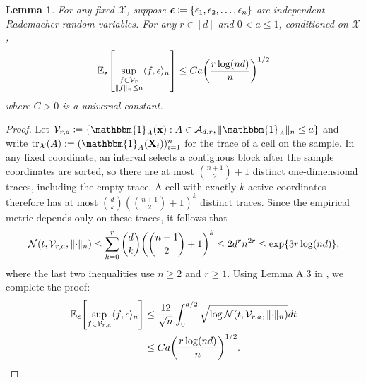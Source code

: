 \documentclass[11pt]{article}
\theoremstyle{plain}
\newtheorem{lemma}[theorem]{Lemma}
\theoremstyle{definition}
\theoremstyle{remark}
\theoremstyle{plain}
\newcommand{\bx}{\mathbf{x}}
\newcommand{\bX}{\mathbf{X}}
\DeclarePairedDelimiter{\braces}{\lbrace}{\rbrace}
\DeclarePairedDelimiter{\bracks}{[}{]}
\DeclarePairedDelimiter{\paren}{(}{)}
\DeclarePairedDelimiter{\norm}{\|}{\|}
\DeclarePairedDelimiter{\inprod}{\langle}{\rangle}
\newcommand{\E}{\mathbb{E}}
\newcommand{\partfunc}{\mathcal{V}}
\newcommand{\1}{\mathbbm{1}}
\newcommand{\sample}{\mathcal{X}}
\begin{document}
\begin{lemma}
\label{lem:subG_multiplier_sup_cond_exp}
    For any fixed $\sample$, suppose $\boldsymbol{\epsilon} \coloneqq \braces{\epsilon_1,\epsilon_2,\ldots,\epsilon_n}$ are independent Rademacher random variables.
    For any $r\in[d]$ and $0 < a \leq 1$, conditioned on $\sample$,
    \begin{equation}
        \E_{\boldsymbol{\epsilon}}\bracks*{\sup_{\substack{f \in \partfunc_r \\
        \norm{f}_n \leq a}} \inprod{f,\epsilon}_n} \leq Ca\paren*{\frac{r\log(nd)}{n}}^{1/2}
    \end{equation}
    where $C > 0$ is a universal constant.
\end{lemma}
\begin{proof}

Let $\partfunc_{r,a}\coloneqq\{\1_A(\bx):A\in\mathcal{A}_{d,r},\norm{\1_A}_n\leq a\}$ and
write $\operatorname{tr}_{\sample}(A):=(\1_A(\bX_i))_{i=1}^n$ for the
trace of a cell on the sample. In any fixed coordinate, an interval
selects a contiguous block after the sample coordinates are sorted, so
there are at most $\binom{n+1}{2}+1$ distinct one-dimensional traces,
including the empty trace. A cell with exactly $k$ active coordinates
therefore has at most
$\binom{d}{k}(\binom{n+1}{2}+1)^k$ distinct traces. Since the empirical
metric depends only on these traces, it follows that
 \begin{equation*}
     \mathcal{N}(t,\partfunc_{r,a},\norm{\cdot}_n)
     \leq \sum_{k=0}^r\binom{d}{k}
     \paren*{\binom{n+1}{2}+1}^k
     \leq 2d^rn^{2r}
     \leq \exp\{3r\log(nd)\},
 \end{equation*}
where the last two inequalities use $n\ge2$ and $r\ge1$.
 Using Lemma A.3 in \citet{NIPS2010_refined_rade}, we complete the proof:
 \begin{equation}
    \begin{split}
         \E_{\boldsymbol{\epsilon}}\bracks*{\sup_{f \in \partfunc_{r,a} } \inprod{f,\epsilon}_n}
        &\leq \frac{12}{\sqrt{n}}\int_{0}^{a/2}
        \sqrt{\log\mathcal{N}(t,\partfunc_{r,a},\norm{\cdot}_n )}dt\\
        &\leq Ca\paren*{\frac{r\log(nd)}{n}}^{1/2}.
    \end{split}
\end{equation}
\end{proof}
\end{document}
